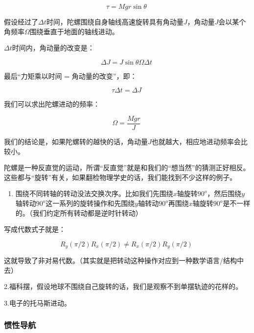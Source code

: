 \begin{equation}
\tau = Mg r \sin \theta~
\end{equation}

假设经过了$\Delta t$时间，陀螺围绕自身轴线高速旋转具有角动量$J$，角动量$J$会以某个角频率$\Omega$围绕垂直于地面的轴线进动。

$\Delta t$时间内，角动量的改变是：

\begin{equation}
\Delta J = J \sin \theta \Omega \Delta t~
\end{equation}

最后“力矩乘以时间 = 角动量的改变”，即：

\begin{equation}
\tau \Delta t = \Delta J~
\end{equation}

我们可以求出陀螺进动的频率：

\begin{equation}
\Omega = \frac{Mg r}{J}~
\end{equation}

我们的结论是，如果陀螺转的越快的话，角动量$J$也就越大，相应地进动频率会比较小。

陀螺是一种反直觉的运动，所谓“反直觉”就是和我们的“想当然”的猜测正好相反。这些都与“旋转”有关，如果翻检物理学史的话，我们能找到不少这样的例子。

\begin{enumerate}
\item 

围绕不同转轴的转动没法交换次序。比如我们先围绕$x$轴旋转$90^o$，然后围绕$y$轴转动$90^o$这一系列的旋转操作和先围绕$y$轴转动$90^o$再围绕$x$轴旋转$90^o$是不一样的。（我们约定所有转动都是逆时针转动）
\end{enumerate}

写成代数式子就是：

\begin{equation}
R_y (\pi /2)  R_x (\pi/2)  \neq  R_x (\pi/2)  R_y (\pi /2)~
\end{equation}

这就导致了非对易代数。（其实就是把转动这种操作对应到一种数学语言/结构中去）

2.福科摆，假设地球不围绕自己旋转的话，我们是观察不到单摆轨迹的花样的。

3.电子的托马斯进动。

\subsubsection{惯性导航}

